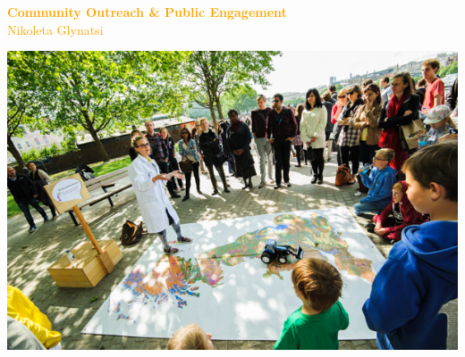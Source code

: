 \documentclass{beamer}
\begin{document}
\begin{frame}
	\begin{center}
        \Large{\textcolor{orange}{\textbf{Community Outreach \& Public Engagement}}} \\ \vfill
        \textcolor{orange}{Nikoleta Glynatsi}
	\end{center}
\end{frame}

\begin{frame}
    \begin{center}
        \includegraphics[width=\textwidth]{img/outreach.jpg}
    \end{center}
\end{frame}
\end{document}
